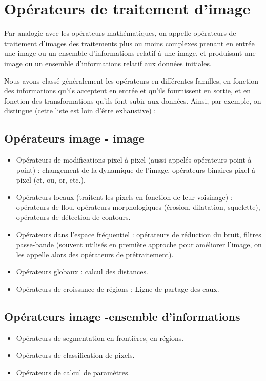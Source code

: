 \documentclass[11pt]{report}
\begin{document}
\section{Opérateurs de traitement d’image}
Par analogie avec les opérateurs mathématiques, on appelle opérateurs de
traitement d'images des traitements plus ou moins complexes prenant en entrée une image
ou un ensemble d'informations relatif à une image, et produisant une image ou un ensemble
d'informations relatif aux données initiales.

Nous avons classé généralement les opérateurs en différentes familles, en fonction
des informations qu'ils acceptent en entrée et qu'ils fournissent en sortie, et en fonction des
transformations qu'ils font subir aux données. Ainsi, par exemple, on distingue (cette liste
est loin d'être exhaustive) :

\subsection*{Opérateurs image - image} 
\begin{itemize}
\item  Opérateurs de modifications pixel à pixel (aussi appelés opérateurs point à point) :
changement de la dynamique de l'image, opérateurs binaires pixel à pixel (et, ou, or,
etc.).
\item 
Opérateurs locaux (traitent les pixels en fonction de leur voisinage) : opérateurs de
flou, opérateurs morphologiques (érosion, dilatation, squelette), opérateurs de
détection de contours.
\item 
Opérateurs dans l'espace fréquentiel : opérateurs de réduction du bruit, filtres
passe-bande (souvent utilisés en première approche pour améliorer l'image, on les
appelle alors des opérateurs de prétraitement).
\item  Opérateurs globaux : calcul des distances.
\item Opérateurs de croissance de régions : Ligne de partage des eaux.

\end{itemize}
\subsection*{Opérateurs image -ensemble d'informations}
\begin{itemize}
\item Opérateurs de segmentation en frontières, en régions.
\item  Opérateurs de classification de pixels.
\item  Opérateurs de calcul de paramètres.
\end{itemize}
\end{document}
